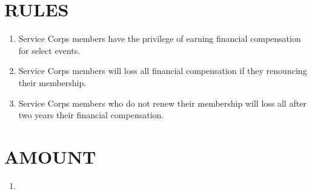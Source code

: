 \documentclass{Service_Corps_Document}
\begin{document}
    \def \Title {Financial Compensation}
    \def \Company {Service Corps}
    \def \versionNumber {1.0}
    \stdFooter
    \begin{titlepage}
        \stdTitlePage
    \end{titlepage}

    \tableofcontents

    \newpage


    \section{RULES}
    \begin{enumerate}
        \item Service Corps members have the privilege of earning financial compensation for select events.
        \item Service Corps members will loss all financial compensation if they renouncing their membership.
        \item Service Corps members who do not renew their membership will loss all after two years their financial compensation.
    \end{enumerate}


    \section{AMOUNT}
    \begin{enumerate}
        \item
    \end{enumerate}
\end{document}
